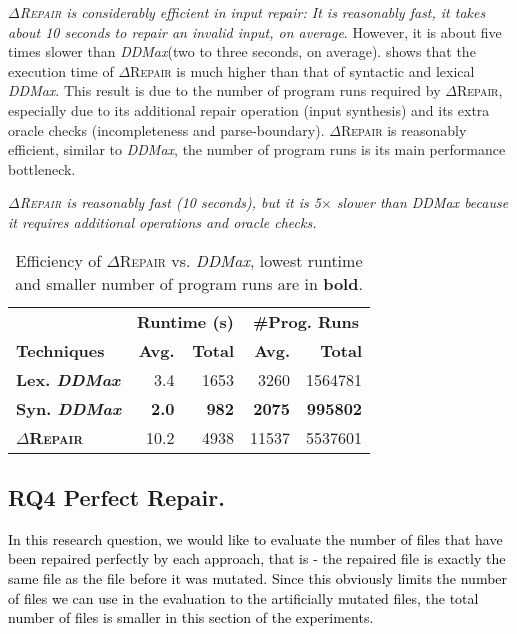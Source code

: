 \documentclass[acmsmall,screen,review,anonymous]{acmart}
\newenvironment{result}{\begin{framed}\centering\it}{\end{framed}}
\newcommand{\revise}[1]{\textcolor{black}{#1}}
\newcommand{\approach}{\textsc{$\Delta$Repair}\xspace}
\newcommand{\ddmax}{\textit{DDMax}\xspace}
\begin{document}
\textit{\approach is considerably efficient in input repair: It is reasonably fast, it takes about 10 seconds to repair an invalid input, on average}. However, it is about five times slower than \ddmax (two to three seconds, on average). 
shows %
that the execution time
of \approach %
is much higher %
than that of syntactic and lexical \ddmax. 
This result is %
due to the %
number of program runs required by \approach, especially due to its additional repair operation (input synthesis) and its extra oracle checks (incompleteness and parse-boundary).
\approach is reasonably efficient, similar to \ddmax, the number of program runs 
is its main performance bottleneck. %

\begin{result}
\approach is reasonably fast (10 seconds), but it 
is 5$\times$ slower than \ddmax because it requires
additional operations and oracle checks. 
\end{result}

\begin{table}[!tbp]\centering
\caption{Efficiency of \approach vs. \ddmax, lowest runtime and smaller number of program runs %
are in \textbf{bold}. %
}
\begin{tabular}{|l |  r  r | r  r |}
\hline
&  \multicolumn{2}{c|}{\textbf{Runtime (s)}} & \multicolumn{2}{c|}{\textbf{\#Prog. Runs}}  \\
\textbf{Techniques} %
&  \textbf{Avg.}  & \textbf{Total} & \textbf{Avg.}  & \textbf{Total} \\
\hline
\textbf{Lex. \ddmax} & 3.4 & 1653 & 3260 & 1564781 \\
\textbf{Syn. \ddmax} & \textbf{2.0} & \textbf{982}  & \textbf{2075}  & \textbf{995802}  \\
\hline
\textbf{\approach} &  10.2 & 4938  & 11537 & 5537601  \\
\hline
\end{tabular}
\label{tab:efficiency}
\end{table}

\subsection{RQ4 Perfect Repair.}
\revise{In this research question, we would like to evaluate the number of files that have been repaired perfectly by each approach, that is - the repaired file is exactly the same file as the file before it was mutated.
Since this obviously limits the number of files we can use in the evaluation to the artificially mutated files, the total number of files is smaller in this section of the experiments.}
\end{document}
